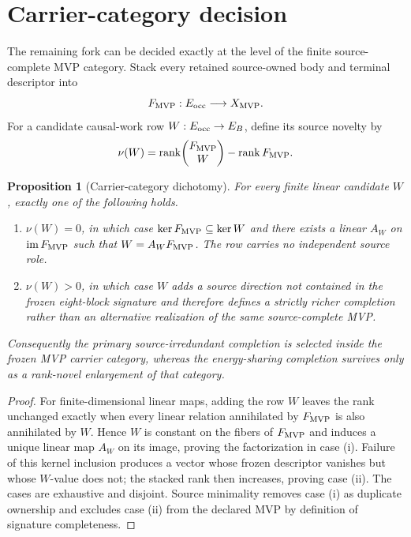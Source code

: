 \documentclass[11pt]{article}
\newtheorem{proposition}{Proposition}
\begin{document}
\section{Carrier-category decision}

The remaining fork can be decided exactly at the level of the finite
source-complete MVP category. Stack every retained source-owned body and
terminal descriptor into
\begin{equation}
 F_{\rm MVP}:E_{\rm occ}\longrightarrow X_{\rm MVP}.
 \label{eq:complete-descriptor}
\end{equation}
For a candidate causal-work row
\(W:E_{\rm occ}\rightarrow E_B\), define its source novelty by
\begin{equation}
 \nu(W)=\operatorname{rank}\!\begin{pmatrix}F_{\rm MVP}\\ W\end{pmatrix}
 -\operatorname{rank}F_{\rm MVP}.
 \label{eq:work-novelty}
\end{equation}

\begin{proposition}[Carrier-category dichotomy]
For every finite linear candidate \(W\), exactly one of the following holds.
\begin{enumerate}[label=(\roman*)]
 \item \(\nu(W)=0\), in which case
 \(\ker F_{\rm MVP}\subseteq\ker W\) and there exists a linear
 \(A_W\) on \(\operatorname{im}F_{\rm MVP}\) such that
 \(W=A_WF_{\rm MVP}\). The row carries no independent source role.
 \item \(\nu(W)>0\), in which case \(W\) adds a source direction not
 contained in the frozen eight-block signature and therefore defines a
 strictly richer completion rather than an alternative realization of the
 same source-complete MVP.
\end{enumerate}
Consequently the primary source-irredundant completion is selected inside the
frozen MVP carrier category, whereas the energy-sharing completion survives
only as a rank-novel enlargement of that category.
\end{proposition}

\begin{proof}
For finite-dimensional linear maps, adding the row \(W\) leaves the rank
unchanged exactly when every linear relation annihilated by
\(F_{\rm MVP}\) is also annihilated by \(W\). Hence \(W\) is constant on
the fibers of \(F_{\rm MVP}\) and induces a unique linear map \(A_W\) on
its image, proving the factorization in case (i). Failure of this kernel
inclusion produces a vector whose frozen descriptor vanishes but whose
\(W\)-value does not; the stacked rank then increases, proving case (ii).
The cases are exhaustive and disjoint. Source minimality removes case (i)
as duplicate ownership and excludes case (ii) from the declared MVP by
definition of signature completeness.
\end{proof}
\end{document}
